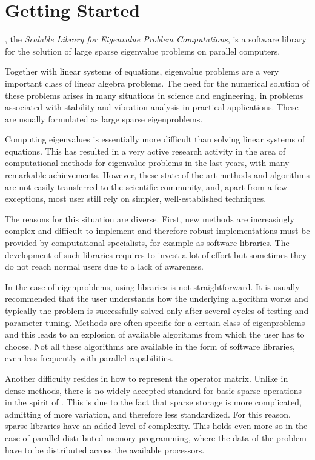 \chapter{\label{cap:int}Getting Started}

\noindent \slepc, the {\em Scalable Library for Eigenvalue Problem Computations}, is a software library for the solution of large sparse eigenvalue problems on parallel computers.

	Together with linear systems of equations, eigenvalue problems are a very important class of linear algebra problems. The need for the numerical solution of these problems arises in many situations in science and engineering, in problems associated with stability and vibration analysis in practical applications. These are usually formulated as large sparse eigenproblems.

	Computing eigenvalues is essentially more difficult than solving linear systems of equations. This has resulted in a very active research activity in the area of computational methods for eigenvalue problems in the last years, with many remarkable achievements.  However, these state-of-the-art methods and algorithms are not easily transferred to the scientific community, and, apart from a few exceptions, most user still rely on simpler, well-established techniques.
	
	The reasons for this situation are diverse. First, new methods are increasingly complex and difficult to implement and therefore robust implementations must be provided by computational specialists, for example as software libraries. The development of such libraries requires to invest a lot of effort but sometimes they do not reach normal users due to a lack of awareness.
	
	In the case of eigenproblems, using libraries is not straightforward. It is usually recommended that the user understands how the underlying algorithm works and typically the problem is successfully solved only after several cycles of testing and parameter tuning. Methods are often specific for a certain class of eigenproblems and this leads to an explosion of available algorithms from which the user has to choose. Not all these algorithms are available in the form of software libraries, even less frequently with parallel capabilities.
	
	Another difficulty resides in how to represent the operator matrix. Unlike in dense methods, there is no widely accepted standard for basic sparse operations in the spirit of \blas. This is due to the fact that sparse storage is more complicated, admitting of more variation, and therefore less standardized. For this reason, sparse libraries have an added level of complexity. This holds even more so in the case of parallel distributed-memory programming, where the data of the problem have to be distributed across the available processors.
	
